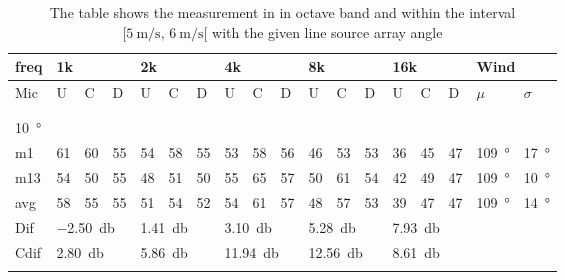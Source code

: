 \begin{table}[H]
\centering
\caption{The table shows the measurement in in octave band and within the interval $[\SI{5}{\meter\per\second},\, \SI{6}{\meter\per\second}[ $ with the given line source array angle}
\setlength\tabcolsep{5pt} %
\begin{tabular}{l|l|l|l|l|l|l|l|l|l|l|l|l|l|l|l|l|l}
freq & \multicolumn{3}{l|}{1k} & \multicolumn{3}{l|}{2k} & \multicolumn{3}{l|}{4k} & \multicolumn{3}{l|}{8k} & \multicolumn{3}{l|}{16k}   &  \multicolumn{2}{l}{Wind}                      \\ \hline
Mic  & U      & C      & D     & U      & C      & D     & U      & C      & D     & U      & C      & D     & U  & C  & D & $\mu$ & $\sigma$ \\ \hline
 & \multicolumn{3}{l|}{} & \multicolumn{3}{l|}{} & \multicolumn{3}{l|}{} & \multicolumn{3}{l|}{} & \multicolumn{3}{l|}{} &      \multicolumn{2}{l}{}                        \\ 
 \multicolumn{18}{l}{ } \\                             
\SI{10}{\degree}   & \multicolumn{3}{l|}{} & \multicolumn{3}{l|}{} & \multicolumn{3}{l|}{} & \multicolumn{3}{l|}{} & \multicolumn{3}{l|}{}  &  \multicolumn{2}{l}{}  \\  \hline
m1   & 61     &  60    & 55    &  54    &   58   &  55   &  53    &  58    &   56  &  46    &  53    &  53   & 36 & 45 &  47 &  \SI{109}{\degree} & \SI{17}{\degree}  \\ 
m13   &  54    &  50    & 55    & 48     &  51    &  50   &  55    &  65    & 57    & 50     &  61    &  54   & 42 & 49 &  47 & \SI{109}{\degree} & \SI{10}{\degree}   \\ \hline
avg & 58     & 55     & 55   &  51    & 54     &  52   &   54   & 61     &  57   &  48    &  57    & 53    & 39 &47 & 47 & \SI{109}{\degree} & \SI{14}{\degree}   \\ \hline 
Dif & \multicolumn{3}{l|}{\SI{-2.50}{\decibel}} & \multicolumn{3}{l|}{\SI{1.41}{\decibel}} & \multicolumn{3}{l|}{\SI{3.10}{\decibel}} & \multicolumn{3}{l|}{\SI{5.28}{\decibel}} & \multicolumn{3}{l|}{\SI{7.93}{\decibel}}  &   \multicolumn{2}{l}{}   \\ \hline 
Cdif & \multicolumn{3}{l|}{\SI{2.80}{\decibel}} & \multicolumn{3}{l|}{\SI{5.86}{\decibel}} & \multicolumn{3}{l|}{\SI{11.94}{\decibel}} & \multicolumn{3}{l|}{\SI{12.56}{\decibel}} & \multicolumn{3}{l|}{\SI{8.61}{\decibel}}  &   \multicolumn{2}{l}{}   \\ 
 \multicolumn{18}{l}{ } \\                             

\end{tabular}
\end{table}
